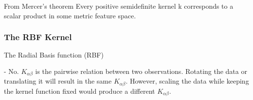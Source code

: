 \begin{frame}\frametitle{\subsubsecname}

\begin{block}{From Mercer's theorem}
Every positive semidefinite kernel k corresponds to a scalar product in
some metric feature space.
\end{block}

\end{frame}

\begin{frame}\frametitle{The RBF Kernel}

The Radial Basis function (RBF) 


- No. $K_{\alpha \beta}$ is the pairwise relation between two observations. 
Rotating the data or translating it will result in the same $K_{\alpha \beta}$. 
However, scaling the data while keeping the kernel function fixed would produce a different $K_{\alpha \beta}$.

\end{frame}
